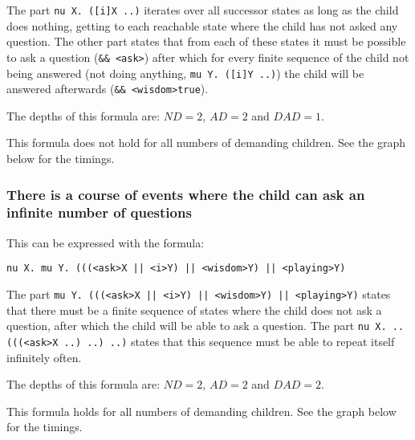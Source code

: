 \documentclass[10pt,a4paper]{article}
\begin{document}
The part {\tt nu X. ([i]X ..)} iterates over all successor states as long as the child does nothing, getting to each reachable state where the child has not asked any question. The other part states that from each of these states it must be possible to ask a question ({\tt \&\& <ask>}) after which for every finite sequence of the child not being answered (not doing anything, {\tt mu Y. ([i]Y ..)}) the child will be answered afterwards ({\tt \&\& <wisdom>true}).

The depths of this formula are: $ND = 2$, $AD = 2$ and $DAD = 1$.

This formula does not hold for all numbers of demanding children. See the graph below for the timings.


\subsubsection{There is a course of events where the child can ask an infinite number of questions}
This can be expressed with the formula:

\begin{center}
	{\tt nu X. mu Y. (((<ask>X || <i>Y) || <wisdom>Y) || <playing>Y)}
\end{center}	
	
The part {\tt mu Y. (((<ask>X || <i>Y) || <wisdom>Y) || <playing>Y)} states that there must be a finite sequence of states where the child does not ask a question, after which the child will be able to ask a question. The part {\tt nu X. .. (((<ask>X ..) ..) ..)} states that this sequence must be able to repeat itself infinitely often.

The depths of this formula are: $ND = 2$, $AD = 2$ and $DAD = 2$.

This formula holds for all numbers of demanding children. See the graph below for the timings.
\end{document}
